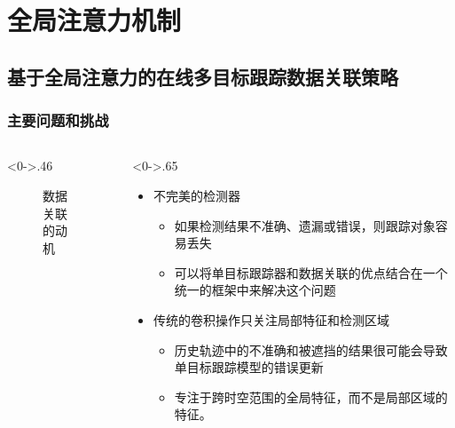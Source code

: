 \section{全局注意力机制}
\subsection{基于全局注意力的在线多目标跟踪数据关联策略}

\begin{frame}
	\frametitle{主要问题和挑战}
	\begin{columns}[T] %
		\begin{column}<0->{.46\textwidth}
			\begin{figure}[thpb]
				\centering
				\caption{数据关联的动机}
			\end{figure}
		\end{column}
		\hfill%
		\begin{column}<0->{.65\textwidth}
			\begin{itemize}
				\item<1-> 不完美的检测器
				\begin{itemize}
					\item<1-> 如果检测结果不准确、遗漏或错误，则跟踪对象容易丢失
					\item<1-> 可以将单目标跟踪器和数据关联的优点结合在一个统一的框架中来解决这个问题
				\end{itemize}
				\item<1-> 传统的卷积操作只关注局部特征和检测区域
				\begin{itemize}
					\item<1-> 历史轨迹中的不准确和被遮挡的结果很可能会导致单目标跟踪模型的错误更新
					\item<1-> 专注于跨时空范围的全局特征，而不是局部区域的特征。
				\end{itemize}
			\end{itemize}
		\end{column}%
	\end{columns}
\end{frame}


